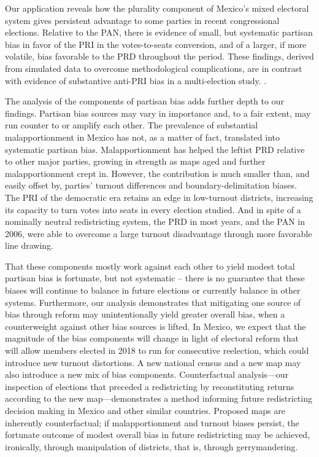 \documentclass[letter,12pt]{article}
\begin{document}
{Our application reveals how the plurality component of Mexico's mixed electoral system gives persistent advantage to some parties in recent congressional elections. Relative to the PAN, there is evidence of small, but systematic partisan bias in favor of the PRI in the votes-to-seats conversion, and of a larger, if more volatile, bias favorable to the PRD throughout the period. These findings, derived from simulated data to overcome methodological complications, are in contrast with evidence of substantive anti-PRI bias in a multi-election study. \citep{marquez2014biasBlog}. 

The analysis of the components of partisan bias adds further depth to our findings. Partisan bias sources may vary in importance and, to a fair extent, may run counter to or amplify each other. The prevalence of substantial malapportionment in Mexico has not, as a matter of fact, translated into systematic partisan bias. Malapportionment has helped the leftist PRD relative to other major parties, growing in strength as maps aged and further malapportionment crept in. However, the contribution is much smaller than, and easily offset by, parties' turnout differences and boundary-delimitation biases. The PRI of the democratic era retains an edge in low-turnout districts, increasing its capacity to turn votes into seats in every election studied. And in spite of a nominally neutral redistricting system, the PRD in most years, and the PAN in 2006, were able to overcome a large turnout disadvantage through more favorable line drawing. 

That these components mostly work against each other to yield modest total partisan bias is fortunate, but not systematic -- there is no guarantee that these biases will continue to balance in future elections or currently balance in other systems. Furthermore, our analysis demonstrates that mitigating one source of bias through reform may unintentionally yield greater overall bias, when a counterweight against other bias sources is lifted. In Mexico, we expect that the magnitude of the bias components will change in light of electoral reform that will allow members elected in 2018 to run for consecutive reelection, which could introduce new turnout distortions. A new national census and a new map may also introduce a new mix of bias components. Counterfactual analysis---our inspection of elections that preceded a redistricting by reconstituting returns according to the new map---demonstrates a method informing future redistricting decision making in Mexico and other similar countries. Proposed maps are inherently counterfactual; if malapportionment and turnout biases persist, the fortunate outcome of modest overall bias in future redistricting may be achieved, ironically, through manipulation of districts, that is, through gerrymandering.

}
\end{document}

